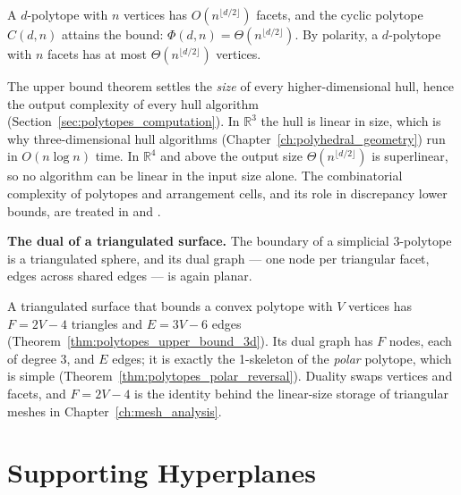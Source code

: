 \begin{theorem}\label{thm:polytopes_upper_bound}
  A $d$-polytope with $n$ vertices has $O(n^{\lfloor d/2 \rfloor})$ facets,
  and the cyclic polytope $C(d,n)$ attains the bound: $\Phi(d,n) =
  \Theta(n^{\lfloor d/2 \rfloor})$. By polarity, a $d$-polytope with $n$
  facets has at most $\Theta(n^{\lfloor d/2 \rfloor})$ vertices.
\end{theorem}

The upper bound theorem settles the \emph{size} of every higher-dimensional
hull, hence the output complexity of every hull algorithm
(Section~\ref{sec:polytopes_computation}). In $\mathbb{R}^3$ the hull is
linear in size, which is why three-dimensional hull algorithms
(Chapter~\ref{ch:polyhedral_geometry}) run in $O(n \log n)$ time. In
$\mathbb{R}^4$ and above the output size $\Theta(n^{\lfloor d/2 \rfloor})$
is superlinear, so no algorithm can be linear in the input size alone. The
combinatorial complexity of polytopes and arrangement cells, and its role in
discrepancy lower bounds, are treated in \cite{matousek1999} and
\cite{edelsbrunner1987}.

\textbf{The dual of a triangulated surface.} The boundary of a simplicial
$3$-polytope is a triangulated sphere, and its dual graph --- one node per
triangular facet, edges across shared edges --- is again planar.

\begin{example}\label{ex:polytopes_dual_triangulation}
  A triangulated surface that bounds a convex polytope with $V$ vertices has
  $F = 2V - 4$ triangles and $E = 3V - 6$ edges
  (Theorem~\ref{thm:polytopes_upper_bound_3d}). Its dual graph has $F$ nodes,
  each of degree $3$, and $E$ edges; it is exactly the 1-skeleton of the
  \emph{polar} polytope, which is simple
  (Theorem~\ref{thm:polytopes_polar_reversal}). Duality swaps vertices and
  facets, and $F = 2V - 4$ is the identity behind the linear-size storage of
  triangular meshes in Chapter~\ref{ch:mesh_analysis}.
\end{example}


\section{Supporting Hyperplanes}
\label{sec:polytopes_supporting_hyperplanes}

